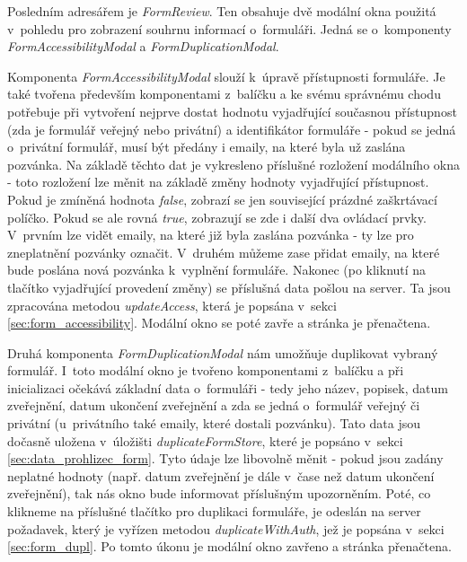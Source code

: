 			\label{sec:modalni_okna_man_form}
			Posledním adresářem je \textit{FormReview}. Ten obsahuje dvě modální okna použitá v~pohledu pro zobrazení souhrnu informací o~formuláři. Jedná se o~komponenty \textit{FormAccessibilityModal} a \textit{FormDuplicationModal}.
			
			Komponenta \textit{FormAccessibilityModal} slouží k~úpravě přístupnosti formuláře. Je také tvořena především komponentami z~balíčku  a ke svému správnému chodu potřebuje při vytvoření nejprve dostat hodnotu vyjadřující současnou přístupnost (zda je formulář veřejný nebo privátní) a identifikátor formuláře - pokud se jedná o~privátní formulář, musí být předány i emaily, na které byla už zaslána pozvánka. Na základě těchto dat je vykresleno příslušné rozložení modálního okna - toto rozložení lze měnit na základě změny hodnoty vyjadřující přístupnost. Pokud je zmíněná hodnota \textit{false}, zobrazí se jen související prázdné zaškrtávací políčko. Pokud se ale rovná \textit{true}, zobrazují se zde i další dva ovládací prvky. V~prvním lze vidět emaily, na které již byla zaslána pozvánka - ty lze pro zneplatnění pozvánky označit. V~druhém můžeme zase přidat emaily, na které bude poslána nová pozvánka k~vyplnění formuláře. Nakonec (po kliknutí na tlačítko vyjadřující provedení změny) se příslušná data pošlou na server. Ta jsou zpracována metodou \textit{updateAccess}, která je popsána v~sekci \ref{sec:form_accessibility}. Modální okno se poté zavře a stránka je přenačtena.
			
			Druhá komponenta \textit{FormDuplicationModal} nám umožňuje duplikovat vybraný formulář. I~toto modální okno je tvořeno komponentami z~balíčku  a při inicializaci očekává základní data o~formuláři - tedy jeho název, popisek, datum zveřejnění, datum ukončení zveřejnění a zda se jedná o~formulář veřejný či privátní (u~privátního také emaily, které dostali pozvánku). Tato data jsou dočasně uložena v~úložišti \textit{duplicateFormStore}, které je popsáno v~sekci \ref{sec:data_prohlizec_form}. Tyto údaje lze libovolně měnit - pokud jsou zadány neplatné hodnoty (např. datum zveřejnění je dále v~čase než datum ukončení zveřejnění), tak nás okno bude informovat příslušným upozorněním. Poté, co klikneme na příslušné tlačítko pro duplikaci formuláře, je odeslán na server požadavek, který je vyřízen metodou \textit{duplicateWithAuth}, jež je popsána v~sekci \ref{sec:form_dupl}. Po tomto úkonu je modální okno zavřeno a stránka přenačtena.
		
